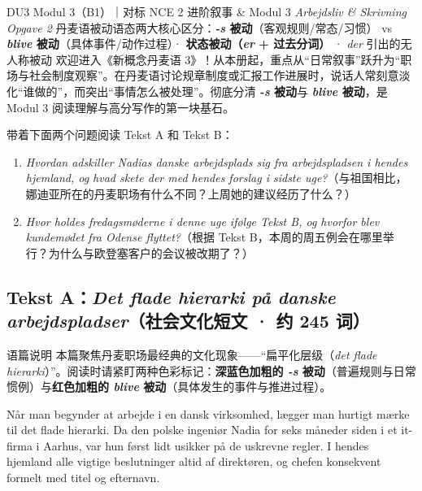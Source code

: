 {DU3 Modul 3（B1）｜对标 NCE 2 进阶叙事 \& Modul 3 \textit{Arbejdsliv \& Skrivning Opgave 2}}
{丹麦语被动语态两大核心区分：\textbf{\textit{-s} 被动}（客观规则/常态/习惯） vs \textbf{\textit{blive} 被动}（具体事件/动作过程）· \textbf{状态被动（\textit{er} + 过去分词）} · \textit{der} 引出的无人称被动}
{欢迎进入《新概念丹麦语 3》！从本册起，重点从“日常叙事”跃升为“职场与社会制度观察”。在丹麦语讨论规章制度或汇报工作进展时，说话人常刻意淡化“谁做的”，而突出“事情怎么被处理”。彻底分清 \textbf{\textit{-s} 被动}与 \textbf{\textit{blive} 被动}，是 Modul 3 阅读理解与高分写作的第一块基石。}

\begin{foerduleaeser}
带着下面两个问题阅读 Tekst A 和 Tekst B：
\begin{enumerate}
  \item \textit{Hvordan adskiller Nadias danske arbejdsplads sig fra arbejdspladsen i hendes hjemland, og hvad skete der med hendes forslag i sidste uge?}（与祖国相比，娜迪亚所在的丹麦职场有什么不同？上周她的建议经历了什么？）
  \item \textit{Hvor holdes fredagsmøderne i denne uge ifølge Tekst B, og hvorfor blev kundemødet fra Odense flyttet?}（根据 Tekst B，本周的周五例会在哪里举行？为什么与欧登塞客户的会议被改期了？）
\end{enumerate}
\end{foerduleaeser}


\subsection*{Tekst A：\textit{Det flade hierarki på danske arbejdspladser}（社会文化短文 · 约 245 词）}

\begin{tipbox}{语篇说明}
本篇聚焦丹麦职场最经典的文化现象——“扁平化层级（\textit{det flade hierarki}）”。阅读时请紧盯两种色彩标记：\textbf{\color{NCDNavy}深蓝色加粗的 \textit{-s} 被动}（普遍规则与日常惯例）与\textbf{\color{NCDRed}红色加粗的 \textit{blive} 被动}（具体发生的事件与推进过程）。
\end{tipbox}

Når man begynder at arbejde i en dansk virksomhed, lægger man hurtigt mærke til det flade hierarki. Da den polske ingeniør Nadia for seks måneder siden  i et it-firma i Aarhus, var hun først lidt usikker på de uskrevne regler. I hendes hjemland  alle vigtige beslutninger altid  af direktøren, og chefen  konsekvent  formelt med titel og efternavn.

